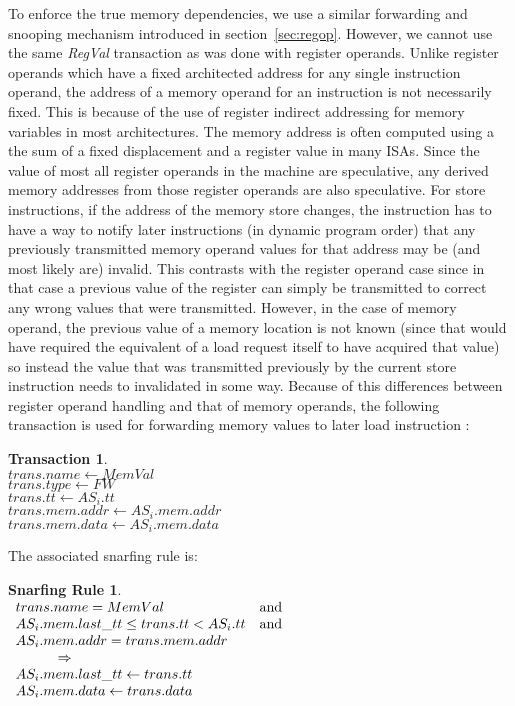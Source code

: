 \documentclass[10pt,twocolumn]{IEEEtran}
\newtheorem{trans}{Transaction}
\newtheorem{snarf}{Snarfing Rule}
\begin{document}
To enforce the true memory dependencies, we use a similar
forwarding and snooping mechanism introduced in
section~\ref{sec:regop}.  However, we cannot use the same
\emph{RegVal} transaction as was done with register operands.  
Unlike register operands which have
a fixed architected address for any single instruction operand, the
address of a memory operand for an instruction is not necessarily fixed.  
This is because of the use of register indirect addressing for memory
variables in most architectures.
The memory
address is often computed using a the sum of a fixed displacement and a
register value in many ISAs.  
Since the value of most all register operands in the machine are
speculative, any derived memory addresses from those register
operands are also speculative.
For store instructions, if the address of the memory store
changes, the instruction has to have a way to notify later
instructions (in dynamic program order) that any previously 
transmitted memory operand values for that address may be 
(and most likely are) invalid.  
This contrasts with the register operand case since in that case a previous
value of the register can simply be transmitted to correct any
wrong values that were transmitted.
However, in the case of memory operand, the previous value of a
memory location is not known (since that would have required the
equivalent of a load request itself to have acquired that value)
so instead the value that was transmitted previously by the current
store instruction needs to invalidated in some way.
Because of this differences between register operand handling
and that of memory operands, the following
transaction is used for forwarding memory values to
later load instruction :
%
\begin{trans}
 \mbox{} \\
 \indent $trans.name \leftarrow MemVal$ \\
 \indent $trans.type \leftarrow FW$ \\
 \indent $trans.tt \leftarrow AS_i.tt$ \\
 \indent $trans.mem.addr \leftarrow AS_i.mem.addr $ \\
 \indent $trans.mem.data \leftarrow AS_i.mem.data $
 \end{trans}
%
The associated snarfing rule is:
%
\begin{snarf}
\label{snar:memval}
\mbox{} \\
\(
\begin{array}{ll}
trans.name = MemVal & \textup{and} \\
AS_i.mem.last\_tt \leq trans.tt < AS_i.tt & \textup{and}\\
AS_i.mem.addr = trans.mem.addr \\
\hspace{3em} \Rightarrow \\
AS_i.mem.last\_tt \leftarrow trans.tt\\
AS_i.mem.data \leftarrow trans.data
\end{array}
\)
\end{snarf}
%
\end{document}

